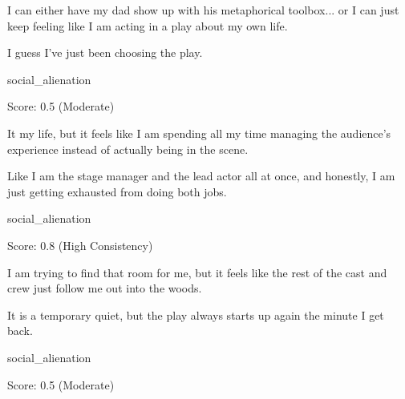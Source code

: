 \begin{tcolorbox}[
    colback=gray!5, colframe=gray!50, arc=2mm, boxrule=0.5pt,
    left=5pt, right=5pt, enhanced, drop shadow, breakable
]
\begin{description}[leftmargin=3.5cm, labelwidth=3.2cm, font=\bfseries, nosep]
    \item[Belief] I can either have my dad show up with his metaphorical toolbox... or I can just keep feeling like I am acting in a play about my own life.
    \item[Action] I guess I've just been choosing the play.
    \item[Belief Type] social\_alienation
    \item[Metrics] Score: 0.5 (Moderate)
\end{description}
\end{tcolorbox}

\begin{tcolorbox}[
    colback=gray!5, colframe=gray!50, arc=2mm, boxrule=0.5pt,
    left=5pt, right=5pt, enhanced, drop shadow, breakable
]
\begin{description}[leftmargin=3.5cm, labelwidth=3.2cm, font=\bfseries, nosep]
    \item[Belief] It my life, but it feels like I am spending all my time managing the audience's experience instead of actually being in the scene.
    \item[Action] Like I am the stage manager and the lead actor all at once, and honestly, I am just getting exhausted from doing both jobs.
    \item[Belief Type] social\_alienation
    \item[Metrics] Score: 0.8 (High Consistency)
\end{description}
\end{tcolorbox}

\begin{tcolorbox}[
    colback=gray!5, colframe=gray!50, arc=2mm, boxrule=0.5pt,
    left=5pt, right=5pt, enhanced, drop shadow, breakable
]
\begin{description}[leftmargin=3.5cm, labelwidth=3.2cm, font=\bfseries, nosep]
    \item[Belief] I am trying to find that room for me, but it feels like the rest of the cast and crew just follow me out into the woods.
    \item[Action] It is a temporary quiet, but the play always starts up again the minute I get back.
    \item[Belief Type] social\_alienation
    \item[Metrics] Score: 0.5 (Moderate)
\end{description}
\end{tcolorbox}

